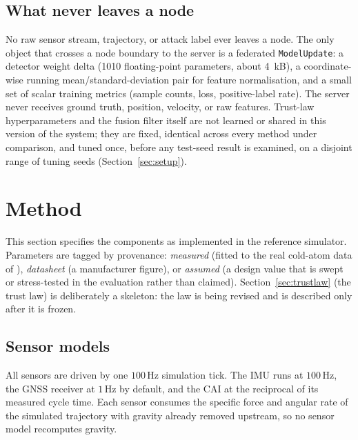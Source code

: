 \documentclass[journal]{IEEEtran}
\begin{document}
\subsection{What never leaves a node}
No raw sensor stream, trajectory, or attack label ever leaves a node. The only object that crosses a node
boundary to the server is a federated \texttt{ModelUpdate}: a detector weight delta (1010 floating-point
parameters, about 4~kB), a coordinate-wise running mean/standard-deviation pair for feature
normalisation, and a small set of scalar training metrics (sample counts, loss, positive-label rate). The
server never receives ground truth, position, velocity, or raw features. Trust-law hyperparameters and
the fusion filter itself are not learned or shared in this version of the system; they are fixed,
identical across every method under comparison, and tuned once, before any test-seed result is examined,
on a disjoint range of tuning seeds (Section~\ref{sec:setup}).

\section{Method}
\label{sec:method}
This section specifies the components as implemented in the reference simulator. Parameters are tagged
by provenance: \emph{measured} (fitted to the real cold-atom data of \cite{darmagnac2024atom}),
\emph{datasheet} (a manufacturer figure), or \emph{assumed} (a design value that is swept or
stress-tested in the evaluation rather than claimed). Section~\ref{sec:trustlaw} (the trust law) is
deliberately a skeleton: the law is being revised and is described only after it is frozen.

\subsection{Sensor models}
\label{sec:sensors}
All sensors are driven by one $100\,\mathrm{Hz}$ simulation tick. The IMU runs at $100\,\mathrm{Hz}$,
the GNSS receiver at $1\,\mathrm{Hz}$ by default, and the CAI at the reciprocal of its measured cycle
time. Each sensor consumes the specific force and angular rate of the simulated trajectory with gravity
already removed upstream, so no sensor model recomputes gravity.
\end{document}
